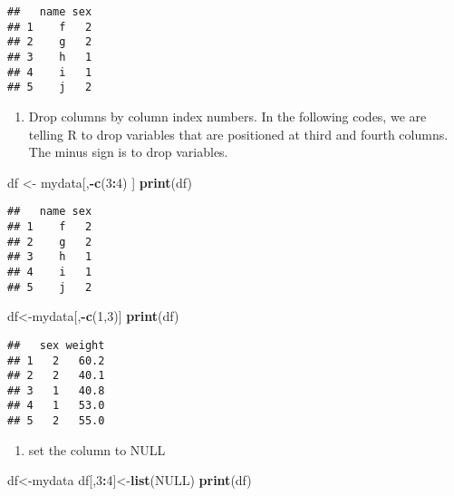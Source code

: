 \documentclass[]{book}
\newenvironment{Shaded}{\begin{snugshade}}{\end{snugshade}}
\newcommand{\KeywordTok}[1]{\textcolor[rgb]{0.13,0.29,0.53}{\textbf{#1}}}
\newcommand{\DecValTok}[1]{\textcolor[rgb]{0.00,0.00,0.81}{#1}}
\newcommand{\StringTok}[1]{\textcolor[rgb]{0.31,0.60,0.02}{#1}}
\newcommand{\OtherTok}[1]{\textcolor[rgb]{0.56,0.35,0.01}{#1}}
\newcommand{\OperatorTok}[1]{\textcolor[rgb]{0.81,0.36,0.00}{\textbf{#1}}}
\newcommand{\NormalTok}[1]{#1}
\providecommand{\tightlist}{%
  \setlength{\itemsep}{0pt}\setlength{\parskip}{0pt}}
\theoremstyle{definition}
\theoremstyle{definition}
\theoremstyle{definition}
\theoremstyle{remark}
\begin{document}
\begin{verbatim}
##   name sex
## 1    f   2
## 2    g   2
## 3    h   1
## 4    i   1
## 5    j   2
\end{verbatim}

\begin{enumerate}
\def\labelenumi{(\arabic{enumi})}
\setcounter{enumi}{2}
\tightlist
\item
  Drop columns by column index numbers. In the following codes, we are
  telling R to drop variables that are positioned at third and fourth
  columns. The minus sign is to drop variables.
\end{enumerate}

\begin{Shaded}
\begin{Highlighting}[]
\NormalTok{df <-}\StringTok{ }\NormalTok{mydata[,}\OperatorTok{-}\KeywordTok{c}\NormalTok{(}\DecValTok{3}\OperatorTok{:}\DecValTok{4}\NormalTok{) ]}
\KeywordTok{print}\NormalTok{(df)}
\end{Highlighting}
\end{Shaded}

\begin{verbatim}
##   name sex
## 1    f   2
## 2    g   2
## 3    h   1
## 4    i   1
## 5    j   2
\end{verbatim}

\begin{Shaded}
\begin{Highlighting}[]
\NormalTok{df<-mydata[,}\OperatorTok{-}\KeywordTok{c}\NormalTok{(}\DecValTok{1}\NormalTok{,}\DecValTok{3}\NormalTok{)]}
\KeywordTok{print}\NormalTok{(df)}
\end{Highlighting}
\end{Shaded}

\begin{verbatim}
##   sex weight
## 1   2   60.2
## 2   2   40.1
## 3   1   40.8
## 4   1   53.0
## 5   2   55.0
\end{verbatim}

\begin{enumerate}
\def\labelenumi{(\arabic{enumi})}
\setcounter{enumi}{3}
\tightlist
\item
  set the column to NULL
\end{enumerate}

\begin{Shaded}
\begin{Highlighting}[]
\NormalTok{df<-mydata}
\NormalTok{df[,}\DecValTok{3}\OperatorTok{:}\DecValTok{4}\NormalTok{]<-}\KeywordTok{list}\NormalTok{(}\OtherTok{NULL}\NormalTok{)}
\KeywordTok{print}\NormalTok{(df)}
\end{Highlighting}
\end{Shaded}
\end{document}
